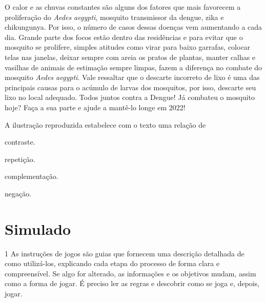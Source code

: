 \begin{myquote}
O calor e as chuvas constantes são alguns dos fatores que mais
favorecem a proliferação do \textit{Aedes aegypti}, mosquito transmissor da
dengue, zika e chikungunya. Por isso, o número de casos dessas doenças
vem aumentando a cada dia. Grande parte dos focos estão dentro das
residências e para evitar que o mosquito se prolifere, simples atitudes
como virar para baixo garrafas, colocar telas nas janelas, deixar sempre
com areia os pratos de plantas, manter calhas e vasilhas de animais de
estimação sempre limpas, fazem a diferença no combate do mosquito 
\textit{Aedes aegypti}. Vale ressaltar que o descarte incorreto de 
lixo é uma das principais causas para o acúmulo de larvas dos mosquitos,
por isso, descarte seu lixo no local adequado. Todos juntos contra a
Dengue! Já combateu o mosquito hoje? Faça a sua parte e ajude a mantê-lo
longe em 2022!

\end{myquote}

A ilustração reproduzida  estabelece com o texto uma relação de

\begin{escolha}

  \item contraste.

  \item repetição.

  \item complementação.

  \item negação.

\end{escolha}

\chapter[Simulado 3]{Simulado}

\num{1} As instruções de jogos são guias que fornecem uma descrição 
detalhada de como utilizá-los, explicando cada etapa do processo de 
forma clara e compreensível. Se algo for alterado, as informações 
e os objetivos mudam, assim como a forma de jogar. É preciso ler 
as regras e descobrir como se joga e, depois, jogar.

